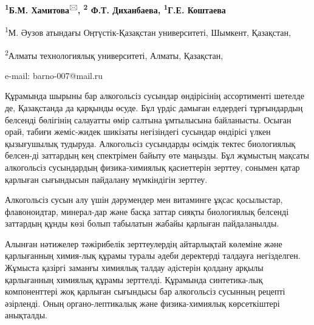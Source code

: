 \begin{center}

{\bfseries \textsuperscript{1}Б.М. Хамитова}\textsuperscript{🖂}{\bfseries ,
\textsuperscript{2} Ф.Т. Диханбаева, \textsuperscript{1}Г.Е. Коштаева}

\textsuperscript{1}М. Әузов атындағы Оңтүстік-Қазақстан университеті,
Шымкент, Қазақстан,

\textsuperscript{2}Алматы технологиялық университеті, Алматы, Қазақстан,

e-mail: barno-007@mail.ru
\end{center}

Құрамында шырыны бар алкогольсіз сусындар өндірісінің ассортименті
шетелде де, Қазақстанда да қарқынды өсуде. Бұл үрдіс дамыған елдердегі
тұрғындардың белсенді бөлігінің салауатты өмір салтына ұмтылысына
байланысты. Осыған орай, табиғи жеміс-жидек шикізаты негізіндегі
сусындар өндірісі үлкен қызығушылық тудыруда. Алкогольсіз сусындарды
өсімдік тектес биологиялық белсен-ді заттардың кең спектрімен байыту өте
маңызды. Бұл жұмыстың мақсаты алкогольсіз сусындардың физика-химиялық
қасиеттерін зерттеу, сонымен қатар қарлыған сығындысын пайдалану
мүмкіндігін зерттеу.

Алкогольсіз сусын алу үшін дәрумендер мен витаминге ұқсас қосылыстар,
флавоноидтар, минерал-дар және басқа заттар сияқты биологиялық белсенді
заттардың құнды көзі болып табылатын жабайы қарлыған пайдаланылды.

Алынған нәтижелер тәжірибелік зерттеулердің айтарлықтай көлеміне және
қарлығанның химия-лық құрамы туралы әдеби деректерді талдауға
негізделген. Жұмыста қазіргі заманғы химиялық талдау әдістерін қолдану
арқылы қарлығанның химиялық құрамы зерттелді. Құрамында синтетика-лық
компоненттері жоқ қарлыған сығындысы бар алкогольсіз сусынның рецепті
әзірленді. Оның органо-лептикалық және физика-химиялық көрсеткіштері
анықталды.

